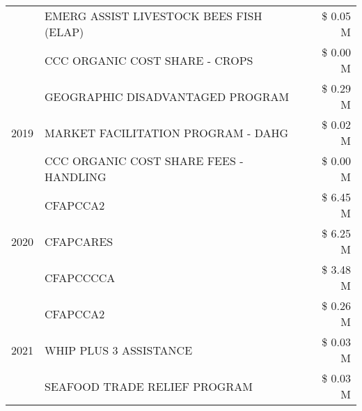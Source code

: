 \begin{tabular}{llr}
 & EMERG ASSIST LIVESTOCK BEES FISH (ELAP) & \$ 0.05 M \\
 & CCC ORGANIC COST SHARE - CROPS & \$ 0.00 M \\
\cline{1-3}
\multirow[t]{3}{*}{2019} & GEOGRAPHIC DISADVANTAGED PROGRAM & \$ 0.29 M \\
 & MARKET FACILITATION PROGRAM - DAHG & \$ 0.02 M \\
 & CCC ORGANIC COST SHARE FEES - HANDLING & \$ 0.00 M \\
\cline{1-3}
\multirow[t]{3}{*}{2020} & CFAPCCA2 & \$ 6.45 M \\
 & CFAPCARES & \$ 6.25 M \\
 & CFAPCCCCA & \$ 3.48 M \\
\cline{1-3}
\multirow[t]{3}{*}{2021} & CFAPCCA2 & \$ 0.26 M \\
 & WHIP PLUS 3 ASSISTANCE & \$ 0.03 M \\
 & SEAFOOD TRADE RELIEF PROGRAM & \$ 0.03 M \\
\cline{1-3}
\bottomrule
\end{tabular}

